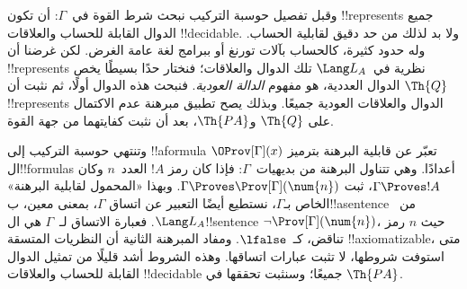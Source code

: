 \documentclass[../../../include/open-logic-section]{subfiles}
\begin{document}
وقبل تفصيل حوسبة التركيب نبحث شرط القوة
في~$\Gamma$: أن تكون !!{represents} جميع
الدوال القابلة للحساب والعلاقات !!{decidable}.
ولا بد لذلك من حد دقيق لقابلية الحساب.
وله حدود كثيرة، كالحساب بآلات تورنغ أو
ببرامج لغة عامة الغرض. لكن غرضنا أن
!!{represents} نظرية في~$\Lang L_A$
تلك الدوال والعلاقات؛ فنختار حدًا بسيطًا
يخص الدوال العددية، هو مفهوم \emph{الدالة
العودية}. فنبحث هذه الدوال أولًا، ثم نثبت
أن $\Th{Q}$ !!{represents} الدوال والعلاقات
العودية جميعًا. وبذلك يصح تطبيق مبرهنة
عدم الاكتمال على $\Th{Q}$ و$\Th{PA}$،
بعد أن نثبت كفايتهما من جهة القوة.

وتنتهي حوسبة التركيب إلى !!a{formula}
$\OProv[\Gamma](x)$ تعبّر عن قابلية البرهنة
بترميز ال!!{formula}s أعدادًا. وهي تتناول
البرهنة من بديهيات~$\Gamma$: فإذا كان
رمز $!A$ العدد~$n$ وكان $\Gamma\Proves !A$،
ثبت $\Gamma\Proves\Prov[\Gamma](\num{n})$.
وبهذا «المحمول لقابلية البرهنة» الخاص
بـ$\Gamma$، نستطيع أيضًا التعبير عن اتساق
$\Gamma$، بمعنى معين، ب!!a{sentence}
من~$\Lang L_A$. فعبارة الاتساق
لـ~$\Gamma$ هي ال!!{sentence}
$\lnot\Prov[\Gamma](\num{n})$، حيث
$n$ رمز تناقض، كـ~$\lfalse$.
ومفاد المبرهنة الثانية أن النظريات المتسقة
!!{axiomatizable}، متى استوفت شروطها،
لا تثبت عبارات اتساقها. وهذه الشروط
أشد قليلًا من تمثيل الدوال القابلة
للحساب والعلاقات !!{decidable} جميعًا؛
وسنثبت تحققها في $\Th{PA}$.
\end{document}

